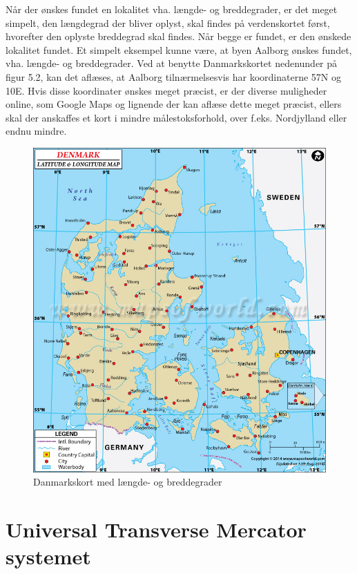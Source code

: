 Når der ønskes fundet en lokalitet vha. længde- og breddegrader, er det meget simpelt, den længdegrad der bliver oplyst, skal findes på verdenskortet først, hvorefter den oplyste breddegrad skal findes. Når begge er fundet, er den ønskede lokalitet fundet. Et simpelt eksempel kunne være, at byen Aalborg ønskes fundet, vha. længde- og breddegrader. Ved at benytte Danmarkskortet nedenunder på figur 5.2, kan det aflæses, at Aalborg tilnærmelsesvis har koordinaterne 57\textdegree N og 10\textdegree E. Hvis disse koordinater ønskes meget præcist, er der diverse muligheder online, som Google Maps og lignende der kan aflæse dette meget præcist, ellers skal der anskaffes et kort i mindre målestoksforhold, over f.eks. Nordjylland eller endnu mindre.  \citep{LongLat}
\begin{figure} [h]
	\centering
	\includegraphics[width=.4\textwidth]{billeder/long-lat-denmark}
	\caption{Danmarkskort med længde- og breddegrader}
\end{figure}

\section{Universal Transverse Mercator systemet}

